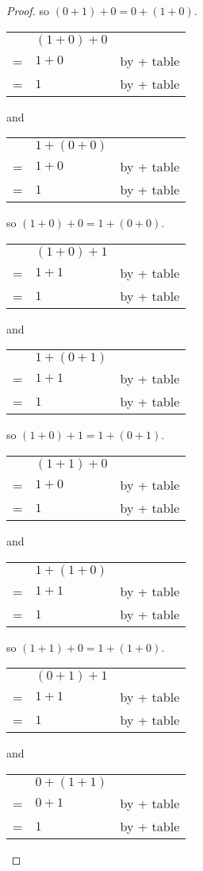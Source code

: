 \documentclass[14pt]{extarticle}
\newcommand{\cy}{\color{cyan}}
\begin{document}
\begin{proof}
  so \((0 + 1) + 0 = 0 + (1 + 0)\).

  \begin{tabular}{cll}
      & \((1 + 0) + 0\) &                  \\
    = & \(1 + 0\)       & {\cy by + table} \\
    = & \(1\)           & {\cy by + table}
  \end{tabular}
  and
  \begin{tabular}{cll}
      & \(1 + (0 + 0)\) &                  \\
    = & \(1 + 0\)       & {\cy by + table} \\
    = & \(1\)           & {\cy by + table}
  \end{tabular}

  so \((1 + 0) + 0 = 1 + (0 + 0)\).

  \begin{tabular}{cll}
      & \((1 + 0) + 1\) &                  \\
    = & \(1 + 1\)       & {\cy by + table} \\
    = & \(1\)           & {\cy by + table}
  \end{tabular}
  and
  \begin{tabular}{cll}
      & \(1 + (0 + 1)\) &                  \\
    = & \(1 + 1\)       & {\cy by + table} \\
    = & \(1\)           & {\cy by + table}
  \end{tabular}

  so \((1 + 0) + 1 = 1 + (0 + 1)\).

  \begin{tabular}{cll}
      & \((1 + 1) + 0\) &                  \\
    = & \(1 + 0\)       & {\cy by + table} \\
    = & \(1\)           & {\cy by + table}
  \end{tabular}
  and
  \begin{tabular}{cll}
      & \(1 + (1 + 0)\) &                  \\
    = & \(1 + 1\)       & {\cy by + table} \\
    = & \(1\)           & {\cy by + table}
  \end{tabular}

  so \((1 + 1) + 0 = 1 + (1 + 0)\).

  \begin{tabular}{cll}
      & \((0 + 1) + 1\) &                  \\
    = & \(1 + 1\)       & {\cy by + table} \\
    = & \(1\)           & {\cy by + table}
  \end{tabular}
  and
  \begin{tabular}{cll}
      & \(0 + (1 + 1)\) &                  \\
    = & \(0 + 1\)       & {\cy by + table} \\
    = & \(1\)           & {\cy by + table}
  \end{tabular}


\end{proof}
\end{document}
